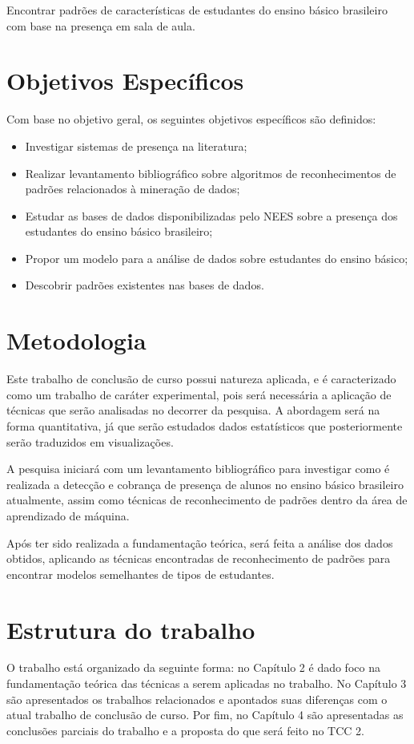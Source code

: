 Encontrar padrões de características de estudantes do ensino básico brasileiro com base na presença em sala de aula.


\section{Objetivos Específicos}

Com base no objetivo geral, os seguintes objetivos específicos são definidos:

		\begin{itemize}
            \item Investigar sistemas de presença na literatura;
            \item Realizar levantamento bibliográfico sobre algoritmos de reconhecimentos de padrões relacionados à mineração de dados;
			\item Estudar as bases de dados disponibilizadas pelo NEES sobre a presença dos estudantes do ensino básico brasileiro;
            \item Propor um modelo para a análise de dados sobre estudantes do ensino básico;
			\item Descobrir padrões existentes nas bases de dados.
		\end{itemize}
	
	\section{Metodologia}
		\label{sec:Metodologia}

		Este trabalho de conclusão de curso possui natureza aplicada, e é caracterizado como um trabalho de caráter experimental, pois será necessária a aplicação de técnicas que serão analisadas no decorrer da pesquisa. A abordagem será na forma quantitativa, já que serão estudados dados estatísticos que posteriormente serão traduzidos em visualizações.

        A pesquisa iniciará com um levantamento bibliográfico para investigar como é realizada a detecção e cobrança de presença de alunos no ensino básico brasileiro atualmente, assim como técnicas de reconhecimento de padrões dentro da área de aprendizado de máquina.

        Após ter sido realizada a fundamentação teórica, será feita a análise dos dados obtidos, aplicando as técnicas encontradas de reconhecimento de padrões para encontrar modelos semelhantes de tipos de estudantes.


\section{Estrutura do trabalho}

O trabalho está organizado da seguinte forma: no Capítulo 2 é dado foco na fundamentação teórica das técnicas a serem aplicadas no trabalho. No Capítulo 3 são apresentados os trabalhos relacionados e apontados suas diferenças com o atual trabalho de conclusão de curso. Por fim, no Capítulo 4 são apresentadas as conclusões parciais do trabalho e a proposta do que será feito no TCC 2.